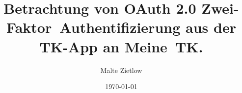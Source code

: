 \documentclass[12pt,oneside,ams,a4paper]{hepthesis}
\author{Malte Zietlow}
\title{Betrachtung von OAuth 2.0
\mbox{Zwei-Faktor Authentifizierung} aus der TK-App an Meine~TK.}
\date{\today}
\begin{document}
\newcommand{\theLocationAndDate}{Hamburg, den \thedate}
\newcommand{\inlinecode}[2]{\colorbox{lightgray}{\lstinline[language=#1]$#2$}}
\renewcommand*\chapterheadstartvskip{\vspace*{-1cm}}
\renewcommand*{\figurename}{Abb.}
\renewcommand*{\figureautorefname}{Abb.}
\renewcommand*{\tablename}{Tab.}
\renewcommand*{\tableautorefname}{Tab.}
\renewcommand*{\chapterautorefname}{Kapitel}
\renewcommand*{\sectionautorefname}{Kapitel}
\renewcommand*{\subsectionautorefname}{Kapitel}
\renewcommand*{\equationautorefname}{Gl.}
\let\harvardleftorig\harvardleft
\newcommand\citevgl
  {\def\harvardleft{(vgl.\ \global\let\harvardleft\harvardleftorig}%
   \cite
  }




\newpage
\begin{frontmatter}
    
\end{frontmatter}

\begin{mainmatter}
    
\end{mainmatter}

\begin{appendices}
    
\end{appendices}

\begin{backmatter}
    
\end{backmatter}
\end{document}
